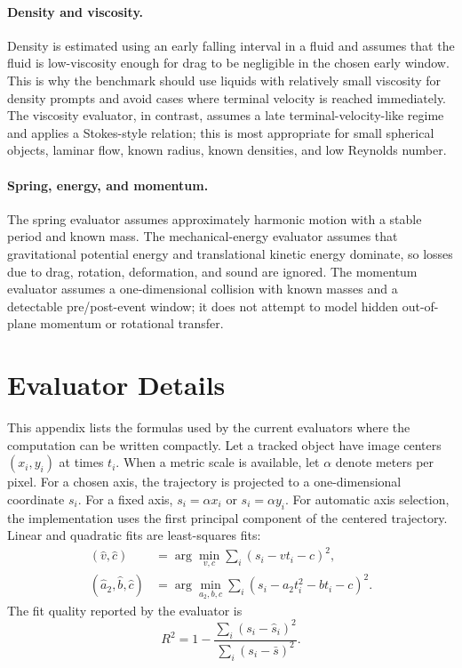 \documentclass{article}
\begin{document}
\paragraph{Density and viscosity.}
Density is estimated using an early falling interval in a fluid and assumes that the fluid is low-viscosity enough for drag to be negligible in the chosen early window.
This is why the benchmark should use liquids with relatively small viscosity for density prompts and avoid cases where terminal velocity is reached immediately.
The viscosity evaluator, in contrast, assumes a late terminal-velocity-like regime and applies a Stokes-style relation; this is most appropriate for small spherical objects, laminar flow, known radius, known densities, and low Reynolds number.

\paragraph{Spring, energy, and momentum.}
The spring evaluator assumes approximately harmonic motion with a stable period and known mass.
The mechanical-energy evaluator assumes that gravitational potential energy and translational kinetic energy dominate, so losses due to drag, rotation, deformation, and sound are ignored.
The momentum evaluator assumes a one-dimensional collision with known masses and a detectable pre/post-event window; it does not attempt to model hidden out-of-plane momentum or rotational transfer.

\section{Evaluator Details}

This appendix lists the formulas used by the current evaluators where the computation can be written compactly.
Let a tracked object have image centers $(x_i,y_i)$ at times $t_i$.
When a metric scale is available, let $\alpha$ denote meters per pixel.
For a chosen axis, the trajectory is projected to a one-dimensional coordinate $s_i$.
For a fixed axis, $s_i=\alpha x_i$ or $s_i=\alpha y_i$.
For automatic axis selection, the implementation uses the first principal component of the centered trajectory.
Linear and quadratic fits are least-squares fits:
\begin{align}
    (\hat{v},\hat{c}) &= \arg\min_{v,c}\sum_i (s_i-vt_i-c)^2,\\
    (\hat{a}_2,\hat{b},\hat{c}) &= \arg\min_{a_2,b,c}\sum_i (s_i-a_2t_i^2-bt_i-c)^2.
\end{align}
The fit quality reported by the evaluator is
\begin{equation}
    R^2 = 1 - \frac{\sum_i(s_i-\hat{s}_i)^2}{\sum_i(s_i-\bar{s})^2}.
\end{equation}
\end{document}
